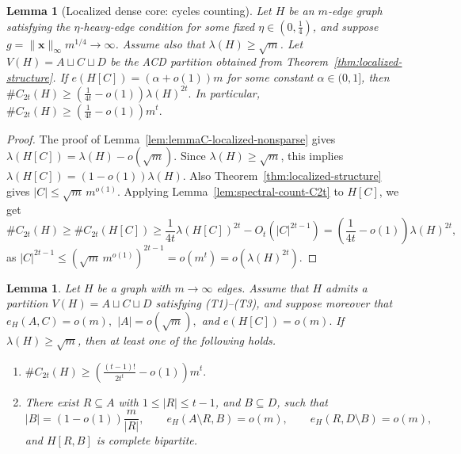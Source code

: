\documentclass[11pt]{article}
\newtheorem{lemma}[theorem]{Lemma}
\theoremstyle{definition}
\theoremstyle{plain}
\begin{document}
\begin{lemma}[Localized dense core:  cycles counting]
\label{lem:cycle-localized-nonsparse}
Let \(H\) be an \(m\)-edge graph satisfying the \(\eta\)-heavy-edge
condition for some fixed \(\eta\in(0,\frac14)\), and suppose
\(g=\|\bm{x}\|_\infty m^{1/4}\to\infty\).  Assume also that
\(\lambda(H)\ge\sqrt m\).  Let
$V(H)=A\sqcup C\sqcup D$
be the ACD partition obtained from Theorem~\ref{thm:localized-structure}.
If $e(H[C])=(\alpha+o(1))m$
for some constant \(\alpha\in(0,1]\), then $\texttt{\#}C_{2t}(H)
        \ge
        \left(\frac{1}{4t}-o(1)\right)\lambda(H)^{2t}.$
In particular, $\texttt{\#}C_{2t}(H)
        \ge
        \left(\frac{1}{4t}-o(1)\right)m^t.$
\end{lemma}

\begin{proof}
The proof of Lemma~\ref{lem:lemmaC-localized-nonsparse} gives $\lambda(H[C])=\lambda(H)-o(\sqrt m).$
Since \(\lambda(H)\ge\sqrt m\), this implies $\lambda(H[C])=(1-o(1))\lambda(H).$
Also Theorem~\ref{thm:localized-structure} gives $|C|\le \sqrt m\,m^{o(1)}.$
Applying Lemma~\ref{lem:spectral-count-C2t} to \(H[C]\), we get
\[
        \texttt{\#}C_{2t}(H)\ge
        \texttt{\#}C_{2t}(H[C])\ge
        \frac{1}{4t}\lambda(H[C])^{2t}
        -
        O_t(|C|^{2t-1})     =
        \left(\frac{1}{4t}-o(1)\right)\lambda(H)^{2t},
\]
as $|C|^{2t-1}
        \le
        \left(\sqrt m\,m^{o(1)}\right)^{2t-1}
        =
        o(m^t)
        =
        o(\lambda(H)^{2t}).$
\end{proof}

\begin{lemma}
\label{lem:cycle-sparseC-rowcover}
Let \(H\) be a graph with \(m\to\infty\) edges.  Assume that \(H\)
admits a partition \(V(H)=A\sqcup C\sqcup D\) satisfying
\textup{(T1)}--\textup{(T3)}, and suppose moreover that $e_H(A,C)=o(m),$ $
        |A|=o(\sqrt m),$ and $        e(H[C])=o(m).$
If \(\lambda(H)\ge\sqrt m\), then at least one of the following holds.
\begin{enumerate}
    \item[\rm(i)] $\texttt{\#}C_{2t}(H)
        \ge
        \left(\frac{(t-1)!}{2t^t}-o(1)\right)m^t.$

    \item[\rm(ii)]
    There exist \(R\subseteq A\) with \(1\le |R|\le t-1\), and
    \(B\subseteq D\), such that
    \[
        |B|=(1-o(1))\frac{m}{|R|},
        \qquad
        e_H(A\setminus R,B)=o(m),
        \qquad
        e_H(R,D\setminus B)=o(m),
    \]
    and \(H[R,B]\) is complete bipartite.
\end{enumerate}
\end{lemma}
\end{document}
